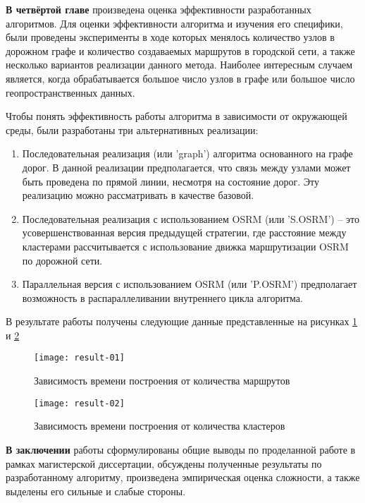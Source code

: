\textbf{В четвёртой главе} произведена оценка эффективности разработанных алгоритмов. Для оценки 
эффективности алгоритма и изучения его специфики, были проведены эксперименты в ходе которых менялось 
количество узлов в дорожном графе и количество создаваемых маршрутов в городской сети, а также несколько 
вариантов реализации данного метода. Наиболее интересным случаем является, когда обрабатывается большое число 
узлов в графе или большое число геопространственных данных.

Чтобы понять эффективность работы алгоритма в зависимости от окружающей среды, были разработаны три 
альтернативных реализации:
\begin{enumerate}
    \item Последовательная реализация (или 'graph') алгоритма основанного на графе дорог. В данной реализации 
        предполагается, что связь между узлами может быть проведена по прямой линии, несмотря на состояние 
        дорог. Эту реализацию можно рассматривать в качестве базовой.
    \item Последовательная реализация с использованием OSRM (или 'S.OSRM') -- это усовершенствованная версия 
        предыдущей стратегии, где расстояние между кластерами рассчитывается с использование движка 
        маршрутизации OSRM по дорожной сети.
    \item Параллельная версия с использованием OSRM (или 'P.OSRM') предполагает возможность в 
        распараллеливании внутреннего цикла алгоритма.  
\end{enumerate}

В результате работы получены следующие данные представленные на рисунках \ref{fig:result-01} и 
\ref{fig:result-02}
\begin{figure}[ht!]
    \centering
    \texttt{[image: result-01]}
    \caption{Зависимость времени построения от количества маршрутов}
    \label{fig:result-01}
\end{figure}

\clearpage

\begin{figure}[ht!]
    \centering
    \texttt{[image: result-02]}
    \caption{Зависимость времени построения от количества кластеров}
    \label{fig:result-02}
\end{figure}

\textbf{В заключении} работы сформулированы общие выводы по проделанной работе в рамках магистерской 
диссертации, обсуждены полученные результаты по разработанному алгоритму, произведена эмпирическая оценка 
сложности, а также выделены его сильные и слабые стороны.

